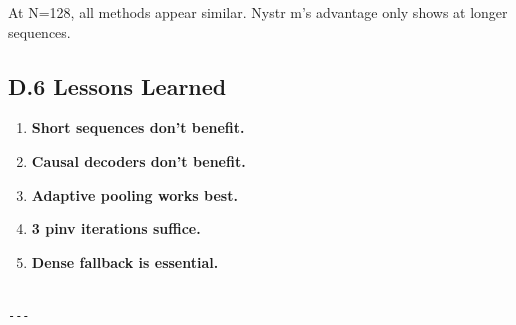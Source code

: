 At N=128, all methods appear similar. Nystr m's advantage only shows at 
longer sequences.

\subsection{D.6 Lessons Learned}

\begin{enumerate}
\item \textbf{Short sequences don't benefit.}
\item \textbf{Causal decoders don't benefit.}
\item \textbf{Adaptive pooling works best.}
\item \textbf{3 pinv iterations suffice.}
\item \textbf{Dense fallback is essential.}
\end{enumerate}
\begin{lstlisting}

---
\end{lstlisting}